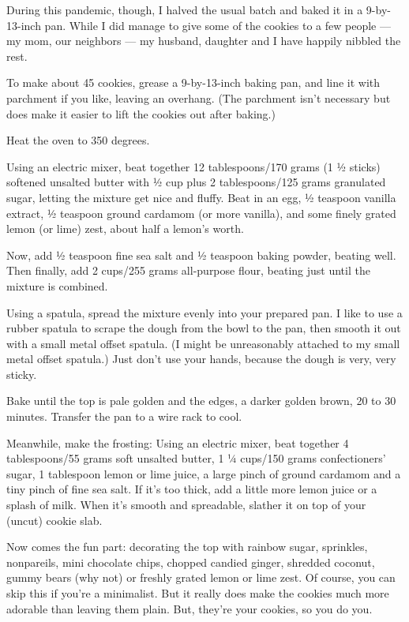 During this pandemic, though, I halved the usual batch and baked it in a
9-by-13-inch pan. While I did manage to give some of the cookies to a
few people --- my mom, our neighbors --- my husband, daughter and I have
happily nibbled the rest.

To make about 45 cookies, grease a 9-by-13-inch baking pan, and line it
with parchment if you like, leaving an overhang. (The parchment isn't
necessary but does make it easier to lift the cookies out after baking.)

Heat the oven to 350 degrees.

Using an electric mixer, beat together 12 tablespoons/170 grams (1 ½
sticks) softened unsalted butter with ½ cup plus 2 tablespoons/125 grams
granulated sugar, letting the mixture get nice and fluffy. Beat in an
egg, ½ teaspoon vanilla extract, ½ teaspoon ground cardamom (or more
vanilla), and some finely grated lemon (or lime) zest, about half a
lemon's worth.

Now, add ½ teaspoon fine sea salt and ½ teaspoon baking powder, beating
well. Then finally, add 2 cups/255 grams all-purpose flour, beating just
until the mixture is combined.

Using a spatula, spread the mixture evenly into your prepared pan. I
like to use a rubber spatula to scrape the dough from the bowl to the
pan, then smooth it out with a small metal offset spatula. (I might be
unreasonably attached to my small metal offset spatula.) Just don't use
your hands, because the dough is very, very sticky.

Bake until the top is pale golden and the edges, a darker golden brown,
20 to 30 minutes. Transfer the pan to a wire rack to cool.

Meanwhile, make the frosting: Using an electric mixer, beat together 4
tablespoons/55 grams soft unsalted butter, 1 ¼ cups/150 grams
confectioners' sugar, 1 tablespoon lemon or lime juice, a large pinch of
ground cardamom and a tiny pinch of fine sea salt. If it's too thick,
add a little more lemon juice or a splash of milk. When it's smooth and
spreadable, slather it on top of your (uncut) cookie slab.

Now comes the fun part: decorating the top with rainbow sugar,
sprinkles, nonpareils, mini chocolate chips, chopped candied ginger,
shredded coconut, gummy bears (why not) or freshly grated lemon or lime
zest. Of course, you can skip this if you're a minimalist. But it really
does make the cookies much more adorable than leaving them plain. But,
they're your cookies, so you do you.

